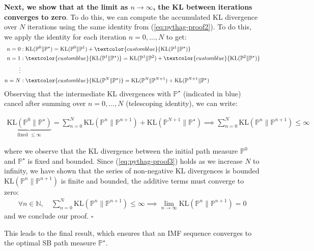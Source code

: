 \documentclass{article}
\newcommand{\bluetext}[1]{\textcolor{customblue}{#1}}
\begin{document}
\textbf{Next, we show that at the limit as $n\to \infty$, the KL between iterations converges to zero}. To do this, we can compute the accumulated KL divergence over $N$ iterations using the same identity from (\ref{eq:pythag-proof2}). To do this, we apply the identity for each iteration $n=0, \dots, N$ to get:
\begin{align}
    n=0&:\text{KL}(\mathbb{P}^0\|\mathbb{P}^\star)=\text{KL}(\mathbb{P}^{0}\|\mathbb{P}^{1})+ \bluetext{\text{KL}(\mathbb{P}^{1}\|\mathbb{P}^\star)}\nonumber\\
    n=1&:\bluetext{\text{KL}(\mathbb{P}^1\|\mathbb{P}^\star)}=\text{KL}(\mathbb{P}^{1}\|\mathbb{P}^{2})+ \bluetext{\text{KL}(\mathbb{P}^{2}\|\mathbb{P}^\star)}\nonumber\\
    \vdots\nonumber\\
    n=N&:\bluetext{\text{KL}(\mathbb{P}^N\|\mathbb{P}^\star)}=\text{KL}(\mathbb{P}^{N}\|\mathbb{P}^{N+1})+ \text{KL}(\mathbb{P}^{N+1}\|\mathbb{P}^\star)
\end{align}
Observing that the intermediate KL divergences with $\mathbb{P}^\star$ (indicated in \bluetext{blue}) cancel after summing over $n=0, \dots , N$ (telescoping identity), we can write:
\begin{small}
\begin{align}
    \underbrace{\text{KL}(\mathbb{P}^0\|\mathbb{P}^\star)}_{\text{fixed }\leq \infty}=\sum_{n=0}^N\text{KL}(\mathbb{P}^{n}\|\mathbb{P}^{n+1})+ \text{KL}(\mathbb{P}^{N+1}\|\mathbb{P}^\star)\implies \sum_{n=0}^N\text{KL}(\mathbb{P}^{n}\|\mathbb{P}^{n+1})\leq \infty\label{eq:pythag-proof3}
\end{align}
\end{small}
where we observe that the KL divergence between the initial path measure $\mathbb{P}^0$ and $\mathbb{P}^\star$ is fixed and bounded. Since (\ref{eq:pythag-proof3}) holds as we increase $N$ to infinity, we have shown that the series of non-negative KL divergences is bounded $\text{KL}(\mathbb{P}^{n}\|\mathbb{P}^{n+1})$ is finite and bounded, the additive terms must converge to zero:
\begin{align}
   \forall n\in \mathbb{N}, \quad \sum_{n=0}^N\text{KL}(\mathbb{P}^{n}\|\mathbb{P}^{n+1})\leq \infty\implies \boxed{\lim_{n \to \infty}\text{KL}(\mathbb{P}^{n}\|\mathbb{P}^{n+1})= 0}
\end{align}
and we conclude our proof. \hfill $\square$

This leads to the final result, which ensures that an IMF sequence converges to the optimal SB path measure $\mathbb{P}^\star$.
\end{document}
